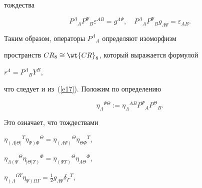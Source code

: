 тождества


\begin{equation}


\label{e20}


P^\Lambda{}_AP^\Psi{}_B\varepsilon^{AB}=g^{\Lambda\Psi},\quad


P^\Lambda{}_AP^\Psi{}_Bg_{\Lambda\Psi}=\varepsilon_{AB}.


\end{equation}


Таким образом, операторы $P^\Lambda{}_A$ определяют изоморфизм


пространств $CR_8\cong \wt {CR}_8$, который выражается формулой


$r^\Lambda=P^\Lambda{}_BY^B$,


что следует и из~(\ref{e17}). Положим по определению


\begin{equation}


\label{e22}


\eta_\Lambda{}^{\Psi\Theta}:=\eta_\Lambda{}^{AB}P^\Psi{}_AP^\Theta{}_B.


\end{equation}


Это означает, что тождествами




$\eta_{\left(\right.\Lambda\left|\Theta\right|}{}^\Upsilon


\eta_{\Psi\left.\right)\Phi}{}^\Theta=


\eta_{(\Lambda\Psi)}{}^\Theta


\eta_{\Theta\Phi}{}^\Upsilon$,


$\eta_{\Lambda\left(\right.\Psi}{}^\Theta


\eta_{\left|\Theta\right|\Upsilon\left.\right)}{}^\Phi=


\eta_{(\Psi\Upsilon)}{}^\Theta


\eta_{\Lambda\Theta}{}^\Phi$,\linebreak


$\eta_{\left(\right.\Lambda}{}^{\Omega\Upsilon}


\eta_{\Psi\left.\right)\Omega\Gamma}=\frac{1}{2}g_{\Lambda\Psi}


\delta_\Gamma{}^\Upsilon$,




